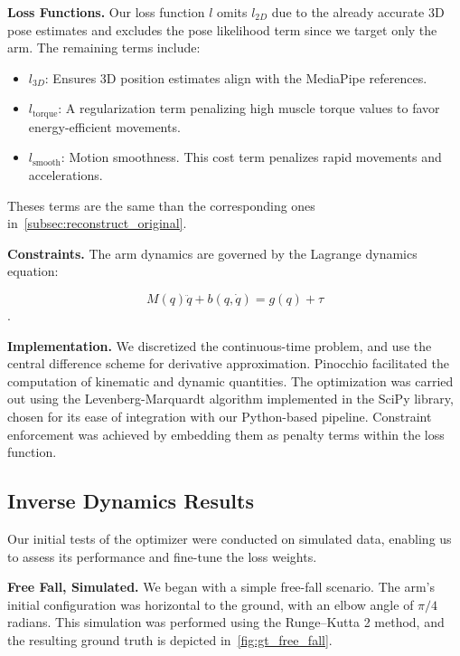\noindent\textbf{Loss Functions.} Our loss function \(l\) omits \(l_{2D}\) due to the already accurate 3D pose estimates and 
excludes the pose likelihood term since we target only the arm. The remaining terms include:

\begin{itemize}
    \item 
        \(l_{3D}\): Ensures 3D position estimates align with the MediaPipe references.
    \item
        \(l_{\text{torque}}\): A regularization term penalizing high muscle torque values to favor energy-efficient movements.
    \item 
        \(l_{\text{smooth}}\): Motion smoothness.
        This cost term penalizes rapid movements and accelerations.
\end{itemize}

Theses terms are the same than the corresponding ones in~\cref{subsec:reconstruct_original}.

\noindent\textbf{Constraints.} The arm dynamics are governed by the Lagrange dynamics equation:

\[
M(q)\ddot{q} + b(q, \dot{q}) = g(q) + \tau
\].

\noindent\textbf{Implementation.} We discretized the continuous-time problem, 
and use the central difference scheme for derivative approximation. 
Pinocchio facilitated the computation of kinematic and dynamic quantities. 
The optimization was carried out using the Levenberg-Marquardt algorithm implemented in the SciPy library, 
chosen for its ease of integration with our Python-based pipeline. 
Constraint enforcement was achieved by embedding them as penalty terms within the loss function.

\subsection{Inverse Dynamics Results}
\label{subsec:dynamic_results}

Our initial tests of the optimizer were conducted on simulated data, enabling us to assess its performance and fine-tune the loss weights.

\noindent\textbf{Free Fall, Simulated.} We began with a simple free-fall scenario. The arm's initial configuration was horizontal to the ground, with an elbow angle of 
\(\pi/4\) radians. This simulation was performed using the Runge–Kutta 2 method, and the resulting ground truth is depicted 
in~\cref{fig:gt_free_fall}.

